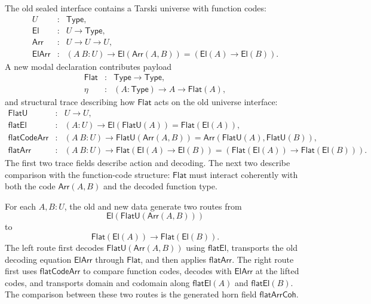 The old sealed interface contains a Tarski universe with function codes:
\[
\begin{array}{rcl}
U &:& \mathsf{Type},\\
\mathsf{El} &:& U \to \mathsf{Type},\\
\mathsf{Arr} &:& U \to U \to U,\\
\mathsf{ElArr} &:& (A\ B:U) \to
  \mathsf{El}(\mathsf{Arr}(A,B)) = (\mathsf{El}(A) \to \mathsf{El}(B)).
\end{array}
\]
A new modal declaration contributes payload
\[
\begin{array}{rcl}
\mathsf{Flat} &:& \mathsf{Type}\to\mathsf{Type},\\
\eta &:& (A:\mathsf{Type})\to A\to\mathsf{Flat}(A),
\end{array}
\]
and structural trace describing how \(\mathsf{Flat}\) acts on the old universe interface:
\[
\begin{array}{rcl}
\mathsf{FlatU} &:& U\to U,\\
\mathsf{flatEl} &:& (A:U)\to
  \mathsf{El}(\mathsf{FlatU}(A)) = \mathsf{Flat}(\mathsf{El}(A)),\\
\mathsf{flatCodeArr} &:& (A\ B:U)\to
  \mathsf{FlatU}(\mathsf{Arr}(A,B)) =
  \mathsf{Arr}(\mathsf{FlatU}(A),\mathsf{FlatU}(B)),\\
\mathsf{flatArr} &:& (A\ B:U)\to
  \mathsf{Flat}(\mathsf{El}(A)\to\mathsf{El}(B)) =
  (\mathsf{Flat}(\mathsf{El}(A))\to\mathsf{Flat}(\mathsf{El}(B))).
\end{array}
\]
The first two trace fields describe action and decoding.  The next two describe comparison
with the function-code structure: \(\mathsf{Flat}\) must interact coherently with both the code
\(\mathsf{Arr}(A,B)\) and the decoded function type.

For each \(A,B:U\), the old and new data generate two routes from
\[
  \mathsf{El}(\mathsf{FlatU}(\mathsf{Arr}(A,B)))
\]
to
\[
  \mathsf{Flat}(\mathsf{El}(A))\to\mathsf{Flat}(\mathsf{El}(B)).
\]
The left route first decodes \(\mathsf{FlatU}(\mathsf{Arr}(A,B))\) using
\(\mathsf{flatEl}\), transports the old decoding equation \(\mathsf{ElArr}\) through
\(\mathsf{Flat}\), and then applies \(\mathsf{flatArr}\).  The right route first uses
\(\mathsf{flatCodeArr}\) to compare function codes, decodes with \(\mathsf{ElArr}\) at the
lifted codes, and transports domain and codomain along \(\mathsf{flatEl}(A)\) and
\(\mathsf{flatEl}(B)\).  The comparison between these two routes is the generated horn field
\(\mathsf{flatArrCoh}\).


